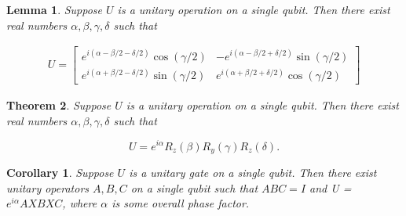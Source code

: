 \documentclass[11pt]{article}
\newcommand\0{\mathbf{0}}
\newcommand\<{\langle}
\renewcommand\>{\rangle}
\newtheorem{theorem}{Theorem}[section]
\newtheorem{corollary}{Corollary}[theorem]
\newtheorem{lemma}[theorem]{Lemma}
\begin{document}

\begin{lemma}\label{4.12}
Suppose $U$ is a unitary operation on a single qubit. Then there exist real numbers $\alpha, \beta, \gamma, \delta$ such that

\begin{align*}
	U = \begin{bmatrix}
 	e^{i(\alpha - \beta / 2 - \delta / 2)} \cos ( \gamma / 2) & -e^{i (\alpha - \beta /2 + \delta / 2)} \sin(\gamma / 2) \\ 
 	e^{i(\alpha + \beta / 2 - \delta / 2)} \sin ( \gamma / 2) & e^{i (\alpha + \beta /2 + \delta / 2)} \cos(\gamma / 2)
 \end{bmatrix}
\end{align*}
\end{lemma}

\begin{theorem}
Suppose $U$ is a unitary operation on a single qubit. Then there exist real numbers $\alpha, \beta, \gamma, \delta$ such that

$$
U = e^{i\alpha}R_z(\beta)R_y(\gamma)R_z(\delta).
$$	
\end{theorem}

\begin{corollary}\label{4.2}
	Suppose $U$ is a unitary gate on a single qubit. Then there exist unitary operators $A, B, C$ on a single qubit such that $ABC = I$ and U = $e^{i\alpha}AXBXC$, where $\alpha$ is some overall phase factor.
\end{corollary}
\end{document}
